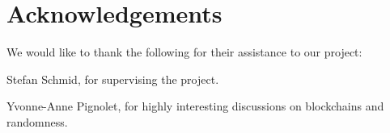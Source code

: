\section{Acknowledgements}\label{sec:acknowledgements}
We would like to thank the following for their assistance to our project:

Stefan Schmid, for supervising the project.

Yvonne-Anne Pignolet, for highly interesting discussions on blockchains and randomness.
 